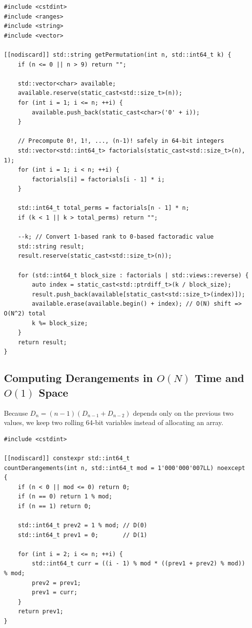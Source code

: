 \documentclass[11pt,a4paper]{article}
\theoremstyle{definition}
\begin{document}
\begin{lstlisting}[caption={Direct k-th Permutation of 1..n using the Factorial Number System}]
#include <cstdint>
#include <ranges>
#include <string>
#include <vector>

[[nodiscard]] std::string getPermutation(int n, std::int64_t k) {
    if (n <= 0 || n > 9) return "";

    std::vector<char> available;
    available.reserve(static_cast<std::size_t>(n));
    for (int i = 1; i <= n; ++i) {
        available.push_back(static_cast<char>('0' + i));
    }

    // Precompute 0!, 1!, ..., (n-1)! safely in 64-bit integers
    std::vector<std::int64_t> factorials(static_cast<std::size_t>(n), 1);
    for (int i = 1; i < n; ++i) {
        factorials[i] = factorials[i - 1] * i;
    }

    std::int64_t total_perms = factorials[n - 1] * n;
    if (k < 1 || k > total_perms) return "";

    --k; // Convert 1-based rank to 0-based factoradic value
    std::string result;
    result.reserve(static_cast<std::size_t>(n));

    for (std::int64_t block_size : factorials | std::views::reverse) {
        auto index = static_cast<std::ptrdiff_t>(k / block_size);
        result.push_back(available[static_cast<std::size_t>(index)]);
        available.erase(available.begin() + index); // O(N) shift => O(N^2) total
        k %= block_size;
    }
    return result;
}
\end{lstlisting}

\subsection{Computing Derangements in $O(N)$ Time and $O(1)$ Space}

Because $D_n = (n - 1)(D_{n-1} + D_{n-2})$ depends only on the previous two values, we keep two rolling 64-bit variables instead of allocating an array.

\begin{lstlisting}[caption={O(N) Time, O(1) Space Modular Derangements}]
#include <cstdint>

[[nodiscard]] constexpr std::int64_t
countDerangements(int n, std::int64_t mod = 1'000'000'007LL) noexcept {
    if (n < 0 || mod <= 0) return 0;
    if (n == 0) return 1 % mod;
    if (n == 1) return 0;

    std::int64_t prev2 = 1 % mod; // D(0)
    std::int64_t prev1 = 0;       // D(1)

    for (int i = 2; i <= n; ++i) {
        std::int64_t curr = ((i - 1) % mod * ((prev1 + prev2) % mod)) % mod;
        prev2 = prev1;
        prev1 = curr;
    }
    return prev1;
}
\end{lstlisting}
\end{document}
